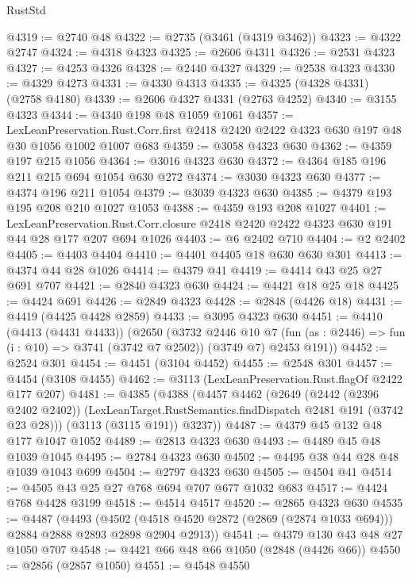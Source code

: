 \begin{lexlean}{RustStd}
\begin{coremodule}
@4319 := @2740 @48
@4322 := @2735 (@3461 (@4319 @3462))
@4323 := @4322 @2747
@4324 := @4318 @4323
@4325 := @2606 @4311
@4326 := @2531 @4323
@4327 := @4253 @4326
@4328 := @2440 @4327
@4329 := @2538 @4323
@4330 := @4329 @4273
@4331 := @4330 @4313
@4335 := @4325 (@4328 @4331) (@2758 @4180)
@4339 := @2606 @4327 @4331 (@2763 @4252)
@4340 := @3155 @4323
@4344 := @4340 @198 @48 @1059 @1061
@4357 := LexLeanPreservation.Rust.Corr.first
    @2418
    @2420
    @2422
    @4323
    @630
    @197
    @48
    @30
    @1056
    @1002
    @1007
    @683
@4359 := @3058 @4323 @630
@4362 := @4359 @197 @215 @1056
@4364 := @3016 @4323 @630
@4372 := @4364 @185 @196 @211 @215 @694 @1054 @630 @272
@4374 := @3030 @4323 @630
@4377 := @4374 @196 @211 @1054
@4379 := @3039 @4323 @630
@4385 := @4379 @193 @195 @208 @210 @1027 @1053
@4388 := @4359 @193 @208 @1027
@4401 := LexLeanPreservation.Rust.Corr.closure
    @2418
    @2420
    @2422
    @4323
    @630
    @191
    @44
    @28
    @177
    @207
    @694
    @1026
@4403 := @6 @2402 @710
@4404 := @2 @2402
@4405 := @4403 @4404
@4410 := @4401 @4405 @18 @630 @630 @301
@4413 := @4374 @44 @28 @1026
@4414 := @4379 @41
@4419 := @4414 @43 @25 @27 @691 @707
@4421 := @2840 @4323 @630
@4424 := @4421 @18 @25 @18
@4425 := @4424 @691
@4426 := @2849 @4323
@4428 := @2848 (@4426 @18)
@4431 := @4419 (@4425 @4428 @2859)
@4433 := @3095 @4323 @630
@4451 := @4410
    (@4413 (@4431 @4433))
    (@2650
      (@3732
        @2446
        @10
        @7
        (fun (as : @2446) => fun (i : @10) => @3741 (@3742 @7 @2502))
        (@3749 @7)
        @2453
        @191))
@4452 := @2524 @301
@4454 := @4451 (@3104 @4452)
@4455 := @2548 @301
@4457 := @4454 (@3108 @4455)
@4462 := @3113 (LexLeanPreservation.Rust.flagOf @2422 @177 @207)
@4481 := @4385
    (@4388
      (@4457
        @4462
        (@2649
          (@2442 (@2396 @2402 @2402))
          (LexLeanTarget.RustSemantics.findDispatch @2481 @191 (@3742 @23 @28)))
        (@3113 (@3115 @191))
        @3237))
@4487 := @4379 @45 @132 @48 @177 @1047 @1052
@4489 := @2813 @4323 @630
@4493 := @4489 @45 @48 @1039 @1045
@4495 := @2784 @4323 @630
@4502 := @4495 @38 @44 @28 @48 @1039 @1043 @699
@4504 := @2797 @4323 @630
@4505 := @4504 @41
@4514 := @4505 @43 @25 @27 @768 @694 @707 @677 @1032 @683
@4517 := @4424 @768 @4428 @3199
@4518 := @4514 @4517
@4520 := @2865 @4323 @630
@4535 := @4487
    (@4493
      (@4502 (@4518 @4520 @2872 (@2869 (@2874 @1033 @694))) @2884 @2888 @2893 @2898 @2904 @2913))
@4541 := @4379 @130 @43 @48 @27 @1050 @707
@4548 := @4421 @66 @48 @66 @1050 (@2848 (@4426 @66))
@4550 := @2856 (@2857 @1050)
@4551 := @4548 @4550

\end{coremodule}
\end{lexlean}
